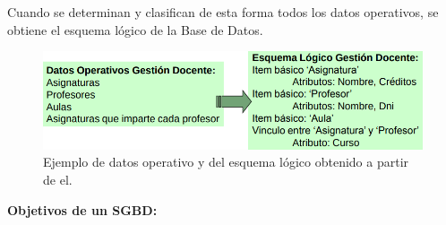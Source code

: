 \documentclass[a4paper,11pt]{article}
\begin{document}
Cuando se determinan y clasifican de esta forma todos los datos operativos, se obtiene el esquema lógico de la Base de Datos.

\begin{figure}[h]
\centering
\includegraphics[scale=1,width=1.1\textwidth]{ejemplo_dato_operativo.png}
\caption{Ejemplo de datos operativo y del esquema lógico obtenido a partir de el.}
\end{figure}

\textbf{Objetivos de un SGBD:}
\end{document}
